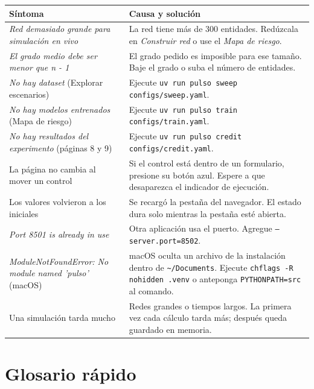 \begin{longtable}{p{}p{}}
\toprule
\textbf{Síntoma} & \textbf{Causa y solución} \\
\midrule
\endhead
\emph{Red demasiado grande para simulación en vivo} & La red tiene más de 300 entidades.
Redúzcala en \emph{Construir red} o use el \emph{Mapa de riesgo}. \\
\emph{El grado medio debe ser menor que n - 1} & El grado pedido es imposible para ese
tamaño. Baje el grado o suba el número de entidades. \\
\emph{No hay dataset} (Explorar escenarios) & Ejecute \texttt{uv run pulso sweep
configs/sweep.yaml}. \\
\emph{No hay modelos entrenados} (Mapa de riesgo) & Ejecute \texttt{uv run pulso train
configs/train.yaml}. \\
\emph{No hay resultados del experimento} (páginas 8 y 9) & Ejecute \texttt{uv run pulso
credit configs/credit.yaml}. \\
La página no cambia al mover un control & Si el control está dentro de un formulario,
presione su botón azul. Espere a que desaparezca el indicador de ejecución. \\
Los valores volvieron a los iniciales & Se recargó la pestaña del navegador. El estado
dura solo mientras la pestaña esté abierta. \\
\emph{Port 8501 is already in use} & Otra aplicación usa el puerto. Agregue
\texttt{--server.port=8502}. \\
\emph{ModuleNotFoundError: No module named 'pulso'} (macOS) & macOS oculta un archivo de
la instalación dentro de \texttt{\textasciitilde/Documents}. Ejecute
\texttt{chflags -R nohidden .venv} o anteponga \texttt{PYTHONPATH=src} al comando. \\
Una simulación tarda mucho & Redes grandes o tiempos largos. La primera vez cada
cálculo tarda más; después queda guardado en memoria. \\
\bottomrule
\end{longtable}

\section{Glosario rápido}

